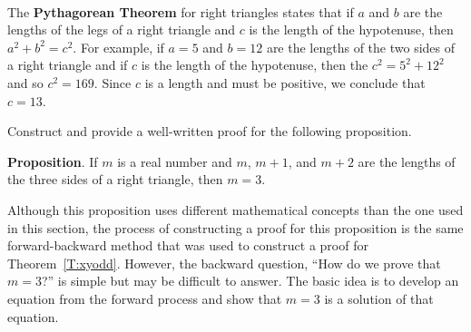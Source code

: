 \begin{prog} \label{pr:pythag} \hfill \\
The \textbf{Pythagorean Theorem}
%
for right triangles states that if $a$ and $b$ are the lengths of the legs of a right triangle and $c$ is the length of the hypotenuse, then $a^2 + b^2 = c^2$.  For example, if $a = 5$ and $b = 12$ are the lengths of the two sides of a right triangle and if $c$ is the length of the hypotenuse, then the $c^2 = 5^2 + 12^2$ and so 
$c^2 = 169$.  Since $c$ is a length and must be positive, we conclude that $c = 13$.

\newpar
Construct and provide a well-written proof for the following proposition.

\newpar
\textbf{Proposition}.  If $m$ is a real number and $m$, $m + 1$, and $m + 2$ are the lengths of the three sides of a right triangle, then $m = 3$.

\newpar
Although this proposition uses different mathematical concepts than the one used in this section, the process of constructing a proof for this proposition is the same forward-backward method that was used to construct a proof for Theorem~\ref{T:xyodd}.  However, the backward question, ``How do we prove that $m = 3$?'' is simple but may be difficult to answer.  The basic idea is to develop an equation from the forward process and show that $m = 3$ is a solution of that equation.
\end{prog}
\hbreak


\endinput




